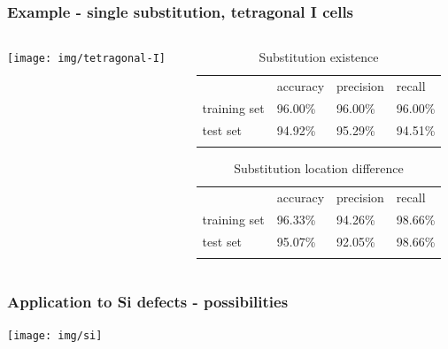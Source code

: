\documentclass{beamer}
\begin{document}
\begin{frame}
\frametitle{Example - single substitution, tetragonal I cells}
\begin{columns}
	\begin{column}{0.34\textwidth}
		\texttt{[image: img/tetragonal-I]}
	\end{column}
	\begin{column}{0.66\textwidth}

\begin{table}[h!]
\begin{center}
\caption{Substitution existence}
\begin{tabular}{llll}
\hline\noalign{\smallskip}
 & accuracy & precision & recall\\
\noalign{\smallskip}
\hline
\noalign{\smallskip}
training set & 96.00\% &  96.00\% & 96.00\% \\
test set & 94.92\% & 95.29\% & 94.51\% \\
\hline
\label{tab:subst}
\end{tabular}
\end{center}
\end{table}

\begin{table}[h!]
\begin{center}
\caption{Substitution location difference}
\begin{tabular}{llll}
\hline\noalign{\smallskip}
 & accuracy & precision & recall\\
\noalign{\smallskip}
\hline
\noalign{\smallskip}
training set & 96.33\% &  94.26\% & 98.66\% \\
test set & 95.07\% & 92.05\% & 98.66\% \\
\hline
\label{tab:substloc}
\end{tabular}
\end{center}
\end{table}

	\end{column}
\end{columns}

\end{frame}

\begin{frame}
\frametitle{Application to Si defects - possibilities}
\begin{center}
	\texttt{[image: img/si]}
\end{center}
\end{frame}
\end{document}
